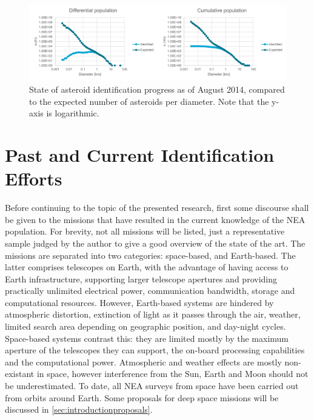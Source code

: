 \begin{figure}[htbp]
 \centering
 \includegraphics[width=1.0\textwidth]{img/population_estimates.pdf}
 \caption{State of asteroid identification progress as of August 2014, compared to the expected number of asteroids per diameter. Note that the y-axis is logarithmic. \cite{HarrisPopulation}}
 \label{fig:population_estimates}
\end{figure}


\section{Past and Current Identification Efforts}
\label{sec:introductionidentification}

Before continuing to the topic of the presented research, first some discourse shall be given to the missions that have resulted in the current knowledge of the NEA population. For brevity, not all missions will be listed, just a representative sample judged by the author to give a good overview of the state of the art. The missions are separated into two categories: space-based, and Earth-based. The latter comprises telescopes on Earth, with the advantage of having access to Earth infrastructure, supporting larger telescope apertures and providing practically unlimited electrical power, communication bandwidth, storage and computational resources. However, Earth-based systems are hindered by atmospheric distortion, extinction of light as it passes through the air, weather, limited search area depending on geographic position, and day-night cycles. Space-based systems contrast this: they are limited mostly by the maximum aperture of the telescopes they can support, the on-board processing capabilities and the computational power. Atmospheric and weather effects are mostly non-existant in space, however interference from the Sun, Earth and Moon should not be underestimated. To date, all NEA surveys from space have been carried out from orbits around Earth. Some proposals for deep space missions will be discussed in \autoref{sec:introductionproposals}.\\

